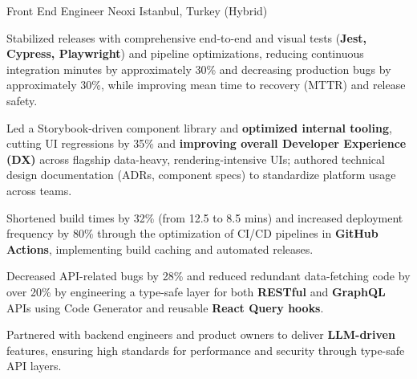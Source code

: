 

\begin{cventries}

  \cventry
  {Front End Engineer} %
  {Neoxi} %
  {Istanbul, Turkey (Hybrid)} %
  {} %
  {
    \begin{cvitems} %
      \item {Stabilized releases with comprehensive end-to-end and visual tests (\textbf{Jest, Cypress, Playwright}) and pipeline optimizations, reducing continuous integration minutes by approximately 30\% and decreasing production bugs by approximately 30\%, while improving mean time to recovery (MTTR) and release safety.}
      \item {Led a Storybook-driven component library and \textbf{optimized internal tooling}, cutting UI regressions by 35\% and \textbf{improving overall Developer Experience (DX)} across flagship data-heavy, rendering-intensive UIs; authored technical design documentation (ADRs, component specs) to standardize platform usage across teams.}
      \item {Shortened build times by 32\% (from 12.5 to 8.5 mins) and increased deployment frequency by 80\% through the optimization of CI/CD pipelines in \textbf{GitHub Actions}, implementing build caching and automated releases.}
      \item {Decreased API-related bugs by 28\% and reduced redundant data-fetching code by over 20\% by engineering a type-safe layer for both \textbf{RESTful} and \textbf{GraphQL} APIs using Code Generator and reusable \textbf{React Query hooks}.}
      \item {Partnered with backend engineers and product owners to deliver \textbf{LLM-driven} features, ensuring high standards for performance and security through type-safe API layers.}
    \end{cvitems}
  }
  \acvDashedSeparator


\end{cventries}
